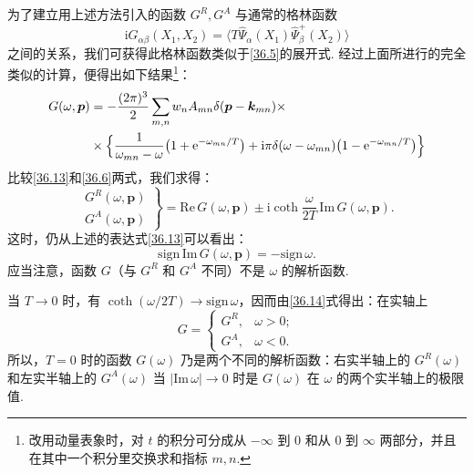 为了建立用上述方法引入的函数 $G^{R},G^{A}$ 与通常的格林函数
\begin{equation}
\mathrm{i}G_{\alpha\beta}(X_1,X_2)=\langle T\hat\Psi_\alpha(X_1)\hat\Psi^{+}_\beta(X_2)\rangle
\label{36.12}
\end{equation}
之间的关系，我们可获得此格林函数类似于\eqref{36.5}的展开式. 经过上面所进行的完全类似的计算，便得出如下结果\footnote{改用动量表象时，对 $t$ 的积分可分成从 $-\infty$ 到 0 和从 0 到 $\infty$ 两部分，并且在其中一个积分里交换求和指标 $m,n$.}：
\begin{equation}
\begin{aligned}
G(\omega,\bm p)&=-\frac{(2\pi)^{3}}{2}\sum_{m,n}w_n A_{mn}\delta(\bm p-\bm k_{mn})\times\\
&\times\Bigl\{\frac{1}{\omega_{mn}-\omega}\bigl(1+\mathrm{e}^{-\omega_{mn}/T}\bigr)
+\mathrm{i}\pi\delta(\omega-\omega_{mn})\bigl(1-\mathrm{e}^{-\omega_{mn}/T}\bigr)\Bigr\}
\end{aligned}
\label{36.13}
\end{equation}
比较\eqref{36.13}和\eqref{36.6}两式，我们求得：
\begin{equation}
\left.\begin{aligned}
G^{R}(\omega,\bm p)\\
G^{A}(\omega,\bm p)
\end{aligned}\right\}
=\mathrm{Re}\,G(\omega,\bm p)\pm\mathrm{i}\coth\frac{\omega}{2T}\,\mathrm{Im}\,G(\omega,\bm p).
\label{36.14}
\end{equation}
这时，仍从上述的表达式\eqref{36.13}可以看出：
\begin{equation}
\mathrm{sign}\,\mathrm{Im}\,G(\omega,\bm p)=-\mathrm{sign}\,\omega.
\label{36.15}
\end{equation}
应当注意，函数 $G$（与 $G^{R}$ 和 $G^{A}$ 不同）不是 $\omega$ 的解析函数.

当 $T\to 0$ 时，有 $\coth(\omega/2T)\to\mathrm{sign}\,\omega$，因而由\eqref{36.14}式得出：在实轴上
\begin{equation}
G=\left\{\begin{array}{ll}
G^{R}, & \omega>0;\\
G^{A}, & \omega<0.
\end{array}\right.
\label{36.16}
\end{equation}
所以，$T=0$ 时的函数 $G(\omega)$ 乃是两个不同的解析函数：右实半轴上的 $G^{R}(\omega)$ 和左实半轴上的 $G^{A}(\omega)$ 当 $|\mathrm{Im}\,\omega|\to 0$ 时是 $G(\omega)$ 在 $\omega$ 的两个实半轴上的极限值.

